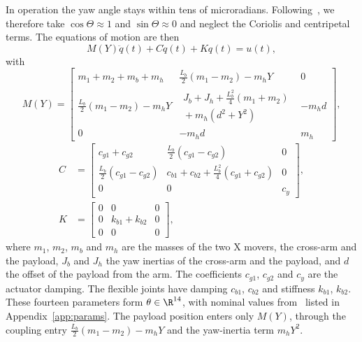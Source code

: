 In operation the yaw angle stays within tens of microradians.
Following~\cite[Sec.~2.3]{garcia2013model}, we therefore take
$\cos\Theta\approx1$ and $\sin\Theta\approx0$ and neglect the Coriolis and
centripetal terms.
The equations of motion are then
\begin{equation}
  M(Y)\ddot{q}(t) + C\dot{q}(t) + K q(t) = u(t),
  \label{eq:eom}
\end{equation}
with
{\footnotesize
\setlength{\arraycolsep}{3pt}
\begin{equation}
M(Y)=
\begin{bmatrix}
m_1+m_2+m_b+m_h & \tfrac{L_b}{2}(m_1-m_2)-m_hY & 0\\
\tfrac{L_b}{2}(m_1-m_2)-m_hY &
\substack{J_b+J_h+\tfrac{L_b^2}{4}(m_1+m_2)\\{}+m_h(d^2+Y^2)} & -m_hd\\
0 & -m_hd & m_h
\end{bmatrix},
\label{eq:mass_matrix}
\end{equation}
\begin{equation}
\begin{aligned}
C&=
\begin{bmatrix}
c_{g1}+c_{g2} & \tfrac{L_b}{2}(c_{g1}-c_{g2}) & 0\\
\tfrac{L_b}{2}(c_{g1}-c_{g2}) &
c_{b1}+c_{b2}+\tfrac{L_b^2}{4}(c_{g1}+c_{g2}) & 0\\
0 & 0 & c_y
\end{bmatrix},\\[1ex]
K&=
\begin{bmatrix}
0&0&0\\
0&k_{b1}+k_{b2}&0\\
0&0&0
\end{bmatrix},
\end{aligned}
\label{eq:damping_stiffness_matrices}
\end{equation}
}
where $m_1$, $m_2$, $m_b$ and $m_h$ are the masses of the two X movers, the
cross-arm and the payload, $J_b$ and $J_h$ the yaw inertias of the cross-arm
and the payload, and $d$ the offset of the payload from the arm.
The coefficients $c_{g1}$, $c_{g2}$ and $c_y$ are the actuator damping.
The flexible joints have damping $c_{b1}$, $c_{b2}$ and stiffness $k_{b1}$,
$k_{b2}$.
These fourteen parameters form $\theta\in\R^{14}$, with nominal values
from~\cite[Table~I]{garcia2013model} listed in Appendix~\ref{app:params}.
The payload position enters only $M(Y)$, through the coupling entry
$\tfrac{L_b}{2}(m_1-m_2)-m_hY$ and the yaw-inertia term $m_hY^2$.

